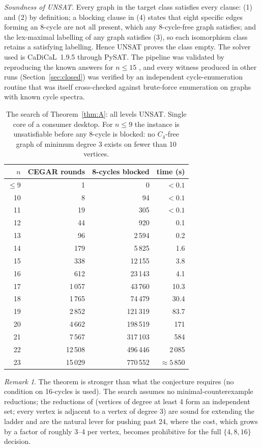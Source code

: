 \documentclass[11pt]{article}
\theoremstyle{remark}
\newtheorem{remark}[theorem]{Remark}
\theoremstyle{definition}
\begin{document}
\emph{Soundness of UNSAT.} Every graph in the target class satisfies every clause: (1) and (2) by definition; a blocking clause in (4) states that eight specific edges forming an 8-cycle are not all present, which any 8-cycle-free graph satisfies; and the lex-maximal labelling of any graph satisfies (3), so each isomorphism class retains a satisfying labelling. Hence UNSAT proves the class empty. The solver used is CaDiCaL~1.9.5 through PySAT. The pipeline was validated by reproducing the known answers for $n\le 15$ \cite{Markstrom}, and every witness produced in other runs (Section~\ref{sec:closed}) was verified by an independent cycle-enumeration routine that was itself cross-checked against brute-force enumeration on graphs with known cycle spectra.

\begin{table}[h]
\centering\small
\begin{tabular}{rrrr}
\toprule
$n$ & CEGAR rounds & 8-cycles blocked & time (s) \\
\midrule
$\le 9$ & 1 & 0 & $<0.1$ \\
10 & 8 & 94 & $<0.1$ \\
11 & 19 & 305 & $<0.1$ \\
12 & 44 & 920 & 0.1 \\
13 & 96 & 2\,594 & 0.2 \\
14 & 179 & 5\,825 & 1.6 \\
15 & 338 & 12\,155 & 3.8 \\
16 & 612 & 23\,143 & 4.1 \\
17 & 1\,057 & 43\,760 & 10.3 \\
18 & 1\,765 & 74\,479 & 30.4 \\
19 & 2\,852 & 121\,319 & 83.7 \\
20 & 4\,662 & 198\,519 & 171 \\
21 & 7\,567 & 317\,103 & 584 \\
22 & 12\,508 & 496\,446 & 2\,085 \\
23 & 15\,029 & 770\,552 & $\approx 5\,850$ \\
\bottomrule
\end{tabular}
\caption{The search of Theorem~\ref{thm:A}: all levels UNSAT. Single core of a consumer desktop. For $n\le 9$ the instance is unsatisfiable before any 8-cycle is blocked: no $C_4$-free graph of minimum degree 3 exists on fewer than 10 vertices.}
\end{table}

\begin{remark}
The theorem is stronger than what the conjecture requires (no condition on 16-cycles is used). The search assumes no minimal-counterexample reductions; the reductions of \cite{Markstrom,Carr} (vertices of degree at least 4 form an independent set; every vertex is adjacent to a vertex of degree 3) are sound for extending the ladder and are the natural lever for pushing past 24, where the cost, which grows by a factor of roughly 3--4 per vertex, becomes prohibitive for the full $\{4,8,16\}$ decision.
\end{remark}
\end{document}
